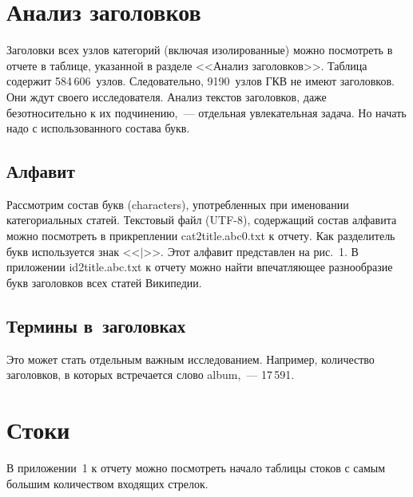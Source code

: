 \begin{multicols}{2}
\vspace*{-6pt}

\section{Анализ заголовков}

\vspace*{-2pt}

 Заголовки всех узлов категорий (включая изолированные) можно посмотреть в отчете в 
таблице, указанной в разделе <<Анализ заголовков>>. Таблица содержит 584\,606~узлов. 
Следовательно, 9190~узлов ГКВ не имеют заголовков. Они ждут своего исследователя. 
Анализ текстов заголовков, даже безотносительно к их подчинению,~--- отдельная 
увлекательная задача. Но начать надо с использованного состава букв.

\vspace*{-6pt}

\subsection{Алфавит}

   Рассмотрим состав букв (characters), упо\-треб\-лен\-ных при именовании категориальных 
статей. Текстовый файл (UTF-8), содержащий состав алфавита можно посмотреть в 
прикреплении {\sf cat2title.abc0.txt}  к отчету. Как разделитель букв используется знак 
<<$\vert$>>. %
Этот алфавит представлен на рис.~1.
В приложении {\sf id2title.abc.txt} к отчету можно найти впечатляющее разнообразие 
букв заголовков всех статей Википедии.

\vspace*{-6pt}

\subsection{Термины в~заголовках}

   Это может стать отдельным важным исследованием. Например, количество заголовков, в 
которых встречается слово album,~--- 17\,591. 

\vspace*{-6pt}

\section{Стоки}

\vspace*{-2pt}

   В приложении~1 к отчету можно посмотреть начало таблицы стоков с самым большим 
количеством входящих стрелок.
   

\end{multicols}
